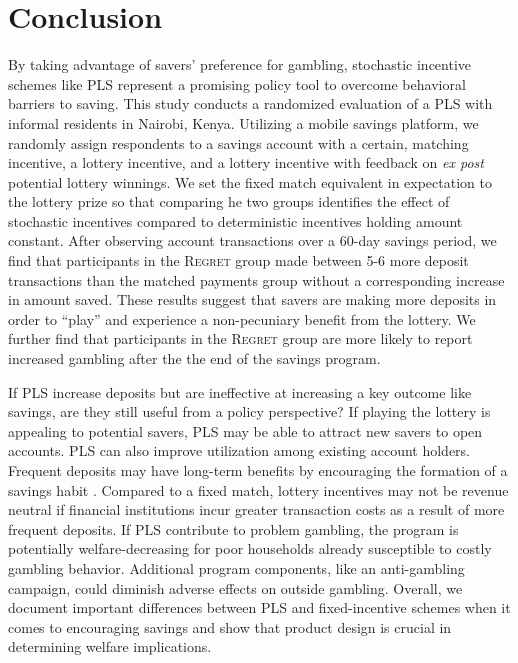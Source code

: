 \documentclass[11pt]{article}
\begin{document}
		

\section{Conclusion} \label{sec:conclusion}

		By taking advantage of savers' preference for gambling, stochastic incentive schemes like PLS represent a promising policy tool to overcome behavioral barriers to saving. This study conducts a randomized evaluation of a PLS with informal residents in Nairobi, Kenya. Utilizing a mobile savings platform, we randomly assign respondents to a savings account with a certain, matching incentive, a lottery incentive, and a lottery incentive with feedback on \textit{ex post} potential lottery winnings. We set the fixed match equivalent in expectation to the lottery prize so that comparing he two groups identifies the effect of stochastic incentives compared to deterministic incentives holding amount constant. After observing account transactions over a 60-day savings period, we find that participants in the \textsc{Regret} group made between 5-6 more deposit transactions than the matched payments group without a corresponding increase in amount saved. These results suggest that savers are making more deposits in order to ``play'' and experience a non-pecuniary benefit from the lottery. We further find that participants in the \textsc{Regret} group are more likely to report increased gambling after the the end of the savings program.

		If PLS increase deposits but are ineffective at increasing a key outcome like savings, are they still useful from a policy perspective? If playing the lottery is appealing to potential savers, PLS may be able to attract new savers to open  accounts. PLS can also improve utilization among existing account holders. Frequent deposits may have long-term benefits by encouraging the formation of a savings habit . Compared to a fixed match, lottery incentives may not be revenue neutral if financial institutions incur greater transaction costs as a result of more frequent deposits. If PLS contribute to problem gambling, the program is potentially welfare-decreasing for poor households already susceptible to costly gambling behavior. Additional program components, like an anti-gambling campaign, could diminish adverse effects on outside gambling. Overall, we document important differences between PLS and fixed-incentive schemes when it comes to encouraging savings and show that product design is crucial in determining welfare implications.
\end{document}
